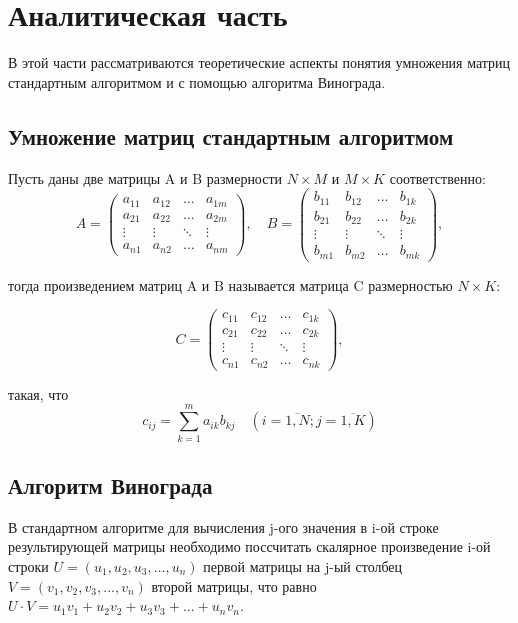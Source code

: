 \documentclass{article}
\begin{document}
\clearpage\section{Аналитическая часть}
В этой части рассматриваются теоретические аспекты понятия умножения матриц стандартным алгоритмом и с помощью
алгоритма Винограда.

\subsection{Умножение матриц стандартным алгоритмом}
Пусть даны две матрицы A и B размерности $N \times M$ и $M \times K$ соответственно:
\begin{equation}
	A = \begin{pmatrix}
		a_{11} & a_{12} & \ldots & a_{1m}\\
		a_{21} & a_{22} & \ldots & a_{2m}\\
		\vdots & \vdots & \ddots & \vdots\\
		a_{n1} & a_{n2} & \ldots & a_{nm}
	\end{pmatrix},
	\quad
	B = \begin{pmatrix}
		b_{11} & b_{12} & \ldots & b_{1k}\\
		b_{21} & b_{22} & \ldots & b_{2k}\\
		\vdots & \vdots & \ddots & \vdots\\
		b_{m1} & b_{m2} & \ldots & b_{mk}
	\end{pmatrix},
\end{equation}

 \noindent тогда произведением матриц A и B называется матрица C размерностью $N \times K$:
 
 \begin{equation}
	C = \begin{pmatrix}
		c_{11} & c_{12} & \ldots & c_{1k}\\
		c_{21} & c_{22} & \ldots & c_{2k}\\
		\vdots & \vdots & \ddots & \vdots\\
		c_{n1} & c_{n2} & \ldots & c_{nk}
	\end{pmatrix},
\end{equation}

\noindent такая, что 
\begin{equation}
	\label{eq:M}
	c_{ij} =
	\sum_{k=1}^{m} a_{ik}b_{kj} \quad (i=\overline{1,N}; j=\overline{1,K})
\end{equation}


\subsection{Алгоритм Винограда}
В стандартном алгоритме для вычисления j-ого значения в i-ой строке результирующей матрицы необходимо поссчитать 
скалярное произведение i-ой строки $U = (u_1, u_2, u_3,..., u_n)$ первой матрицы на j-ый столбец $V = (v_1, v_2, v_3,..., v_n)$
второй матрицы, что равно $U \cdot V = u_1v_1 + u_2v_2 + u_3v_3 + ... + u_nv_n$.
\end{document}
